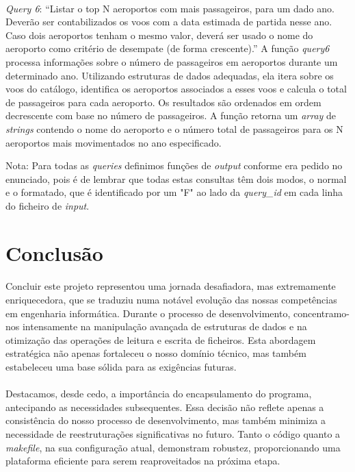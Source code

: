 \documentclass{article}
\begin{document}
\paragraph{}\textit{Query 6}: “Listar o top N aeroportos com mais passageiros, para um dado ano. Deverão ser contabilizados os voos com a data estimada de partida nesse ano. Caso dois aeroportos tenham o mesmo valor, deverá ser usado o nome do aeroporto como critério de desempate (de forma crescente).”
A função \textit{query6} processa informações sobre o número de passageiros em aeroportos durante um determinado ano. Utilizando estruturas de dados adequadas, ela itera sobre os voos do catálogo, identifica os aeroportos associados a esses voos e calcula o total de passageiros para cada aeroporto. Os resultados são ordenados em ordem decrescente com base no número de passageiros. A função retorna um \textit{array} de \textit{strings} contendo o nome do aeroporto e o número total de passageiros para os N aeroportos mais movimentados no ano especificado.

Nota: Para todas as \textit{queries} definimos funções de \textit{output} conforme era pedido no enunciado, pois é de lembrar que todas estas consultas têm dois modos, o normal e o formatado, que é identificado por um "F" ao lado da \textit{query\_id} em cada linha do ficheiro de \textit{input}.

\section{Conclusão}
\paragraph{}Concluir este projeto representou uma jornada desafiadora, mas extremamente enriquecedora, que se traduziu numa notável evolução das nossas competências em engenharia informática. Durante o processo de desenvolvimento, concentramo-nos intensamente na manipulação avançada de estruturas de dados e na otimização das operações de leitura e escrita de ficheiros. Esta abordagem estratégica não apenas fortaleceu o nosso domínio técnico, mas também estabeleceu uma base sólida para as exigências futuras.
\paragraph{}Destacamos, desde cedo, a importância do encapsulamento do programa, antecipando as necessidades subsequentes. Essa decisão não reflete apenas a consistência do nosso processo de desenvolvimento, mas também minimiza a necessidade de reestruturações significativas no futuro. Tanto o código quanto a \textit{makefile}, na sua configuração atual, demonstram robustez, proporcionando uma plataforma eficiente para serem reaproveitados na próxima etapa.
\end{document}
